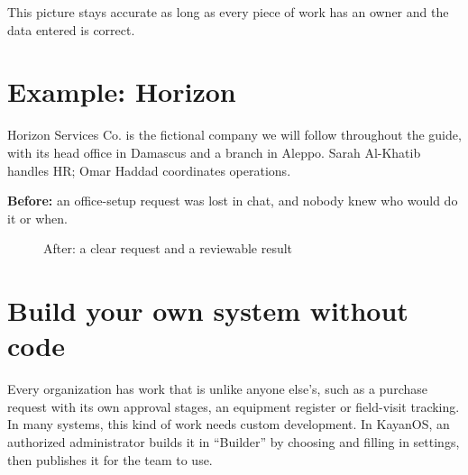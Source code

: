 This picture stays accurate as long as every piece of work has an owner and the data entered is correct.

\section{Example: Horizon}
\label{sec:intro-entity}

Horizon Services Co. is the fictional company we will follow throughout the guide, with its head office in Damascus and a branch in Aleppo. Sarah Al-Khatib handles HR; Omar Haddad coordinates operations.

\textbf{Before:} an office-setup request was lost in chat, and nobody knew who would do it or when.

\begin{figure}[H]
\centering
{}
\rclegend
\caption{After: a clear request and a reviewable result}
\label{fig:intro-workday}
\end{figure}

\section{Build your own system without code}
\label{sec:intro-no-code}

Every organization has work that is unlike anyone else's, such as a purchase request with its own approval stages, an equipment register or field-visit tracking. In many systems, this kind of work needs custom development. In KayanOS, an authorized administrator builds it in “Builder” by choosing and filling in settings, then publishes it for the team to use.


